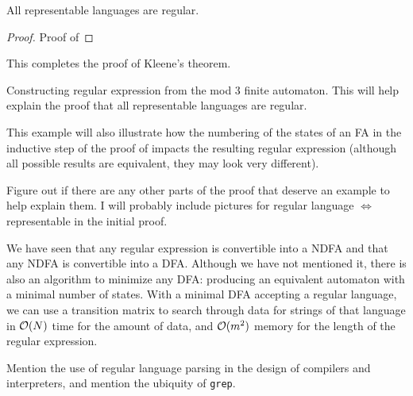 \documentclass{bcthesis}
\renewcommand{\meo}{}
\begin{document}
	\begin{claim}
	\label{prop:representable_languages_regular}
		All representable languages are regular.
	\end{claim}

	\begin{proof}
		Proof of 
	\end{proof}
	

	This completes the proof of Kleene's theorem.



\label{sec:examples}

	\begin{example}
		Constructing regular expression from the mod 3 finite automaton.
		This will help explain the proof that all representable languages are regular.

		This example will also illustrate how the numbering of the states of an FA in the inductive step of the proof of  impacts the resulting regular expression (although all possible results are equivalent, they may look very different).
	\end{example}

	\meo{
		Figure out if there are any other parts of the proof that deserve an example to help explain them.
		I will probably include pictures for regular language $\iff$ representable in the initial proof.
	}


\label{sec:motivation}
	\begin{remark}
		We have seen that any regular expression is convertible into a NDFA and that any NDFA is convertible into a DFA.
		Although we have not mentioned it, there is also an algorithm to minimize any DFA: producing an equivalent automaton with a minimal number of states. 
		With a minimal DFA accepting a regular language, we can use a transition matrix to search through data for strings of that language in $\mathcal{O}(N)$ time for the amount of data, and $\mathcal{O}(m^2)$ memory for the length of the regular expression.
	\end{remark}

	\begin{remark}
		Mention the use of regular language parsing in the design of compilers and interpreters, and mention the ubiquity of \texttt{grep}.
	\end{remark}
\end{document}
